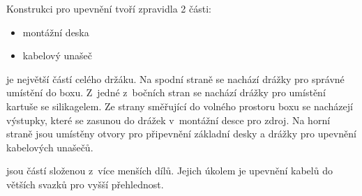 Konstrukci pro upevnění tvoří zpravidla 2 části:
\begin{itemize}
    \item montážní deska
    \item kabelový unašeč
\end{itemize}

\noindent{} je největší částí celého držáku. 
Na spodní straně se nachází drážky pro správné umístění do boxu.
Z~jedné z~bočních stran se nachází drážky pro umístění kartuše se silikagelem.
Ze strany směřující do volného prostoru boxu se nacházejí výstupky, které se zasunou do drážek v~montážní desce pro zdroj.
Na horní straně jsou umístěny otvory pro připevnění základní desky a drážky pro upevnění kabelových unašečů.

\noindent{} jsou částí složenou z~více menších dílů.
Jejich úkolem je upevnění kabelů do větších svazků pro vyšší přehlednost.


\newpage